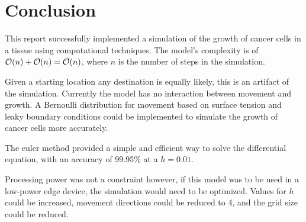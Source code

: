 \chapter{Conclusion}

This report successfully implemented a simulation of the growth of cancer cells in a tissue using computational techniques.
The model's complexity is of $\mathcal{O}(n) + \mathcal{O}(n) = \mathcal{O}(n)$, where $n$ is the number of steps in the simulation.

Given a starting location any destination is equally likely, this is an artifact of the simulation.
Currently the model has no interaction between movement and growth.
A Bernoulli distribution for movement based on surface tension and leaky boundary conditions could be implemented to simulate the growth of cancer cells more accurately.

The euler method provided a simple and efficient way to solve the differential equation, with an accuracy of 99.95\% at a $h = 0.01$.

Processing power was not a constraint however, if this model was to be used in a low-power edge device, the simulation would need to be optimized.
Values for $h$ could be increased, movement directions could be reduced to 4, and the grid size could be reduced.

